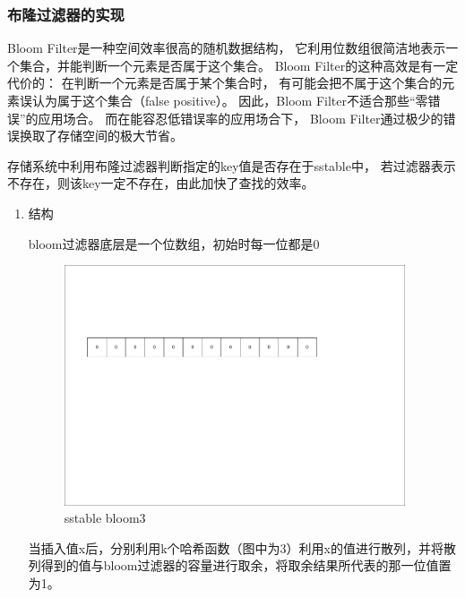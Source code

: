 		\subsubsection{布隆过滤器的实现}


		Bloom Filter是一种空间效率很高的随机数据结构，
		它利用位数组很简洁地表示一个集合，并能判断一个元素是否属于这个集合。
		Bloom Filter的这种高效是有一定代价的：
		在判断一个元素是否属于某个集合时，
		有可能会把不属于这个集合的元素误认为属于这个集合（false positive）。
		因此，Bloom Filter不适合那些“零错误”的应用场合。
		而在能容忍低错误率的应用场合下，
		Bloom Filter通过极少的错误换取了存储空间的极大节省。

存储系统中利用布隆过滤器判断指定的key值是否存在于sstable中，
若过滤器表示不存在，则该key一定不存在，由此加快了查找的效率。

		\begin{enumerate}
			\item 结构 
			
			bloom过滤器底层是一个位数组，初始时每一位都是0 

			\begin{figure}[H]
				\centering
				\includegraphics[width=0.95\textwidth]{pdf/bloom1.pdf}
				\caption{sstable bloom3}
				\label{sstable_bloom3}
			\end{figure}
			

当插入值x后，分别利用k个哈希函数（图中为3）利用x的值进行散列，并将散列得到的值与bloom过滤器的容量进行取余，将取余结果所代表的那一位值置为1。


\end{enumerate}
